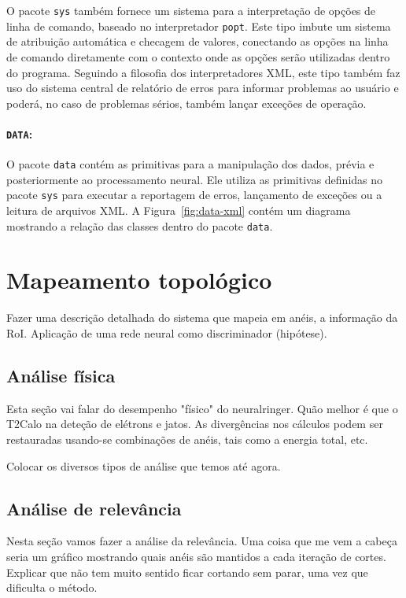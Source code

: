 O pacote \texttt{sys} também fornece um sistema para a interpretação de opções
de linha de comando, baseado no interpretador \texttt{popt}. Este tipo imbute
um sistema de atribuição automática e checagem de valores, conectando as
opções na linha de comando diretamente com o contexto onde as opções serão
utilizadas dentro do programa. Seguindo a filosofia dos interpretadores XML,
este tipo também faz uso do sistema central de relatório de erros para
informar problemas ao usuário e poderá, no caso de problemas sérios, também
lançar exceções de operação.

\paragraph{\texttt{DATA}:} O pacote \texttt{data} contém as primitivas para a
manipulação dos dados, prévia e posteriormente ao processamento neural. Ele
utiliza as primitivas definidas no pacote \texttt{sys} para executar a
reportagem de erros, lançamento de exceções ou a leitura de arquivos XML. A
Figura~\ref{fig:data-xml} contém um diagrama mostrando a relação das classes
dentro do pacote \texttt{data}.

\section{Mapeamento topológico}

Fazer uma descrição detalhada do sistema que mapeia em anéis, a informação da
RoI. Aplicação de uma rede neural como discriminador (hipótese).

\subsection{Análise física}

Esta seção vai falar do desempenho "físico" do neuralringer. Quão melhor é que
o T2Calo na deteção de elétrons e jatos. As divergências nos cálculos podem
ser restauradas usando-se combinações de anéis, tais como a energia total,
etc.

Colocar os diversos tipos de análise que temos até agora.

\subsection{Análise de relevância}

Nesta seção vamos fazer a análise da relevância. Uma coisa que me vem a cabeça
seria um gráfico mostrando quais anéis são mantidos a cada iteração de
cortes. Explicar que não tem muito sentido ficar cortando sem parar, uma vez
que dificulta o método.

